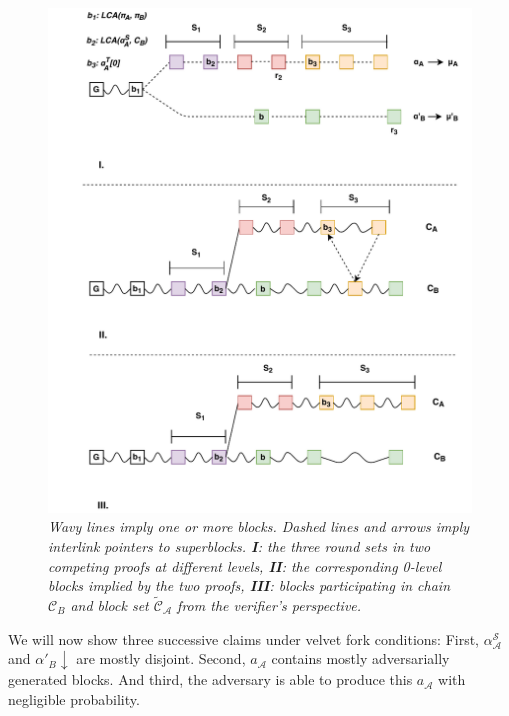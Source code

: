 \begin{figure}[h!]
	\begin{center}
    \includegraphics[scale=0.6]{figures/proof_velvet.pdf}
	\end{center}
	\caption{\textit{ Wavy lines imply one or more blocks. Dashed lines and arrows imply
	interlink pointers to superblocks. \textbf{I}: the three round sets in two competing
	proofs at different levels, \textbf{II}: the corresponding 0-level blocks implied by the two proofs,
	\textbf{III}: blocks participating in chain $\mathcal{C}_B$ and block set $\widetilde{\mathcal{C}}_\mathcal{A}$ from the verifier's perspective.}}	
    \label{fig:proof_velvet}
\end{figure}

We will now show three successive claims under velvet fork conditions: First,
$\alpha^{\mathcal{S}}_\mathcal{A}$ and $\alpha'_B \downarrow$ are mostly
disjoint. Second, $a_\mathcal{A}$ contains mostly adversarially generated blocks. And third,
the adversary is able to produce this $a_\mathcal{A}$ with negligible probability.\\

